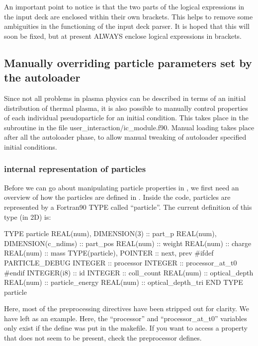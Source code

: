 An important point to notice is that the two parts of the logical expressions
in the input deck are enclosed within their own brackets. This helps to remove
some ambiguities in the functioning of the input deck parser. It is hoped that
this will soon be fixed, but at present ALWAYS enclose logical expressions in
brackets.


\subsection{Manually overriding particle parameters set by the autoloader}
\label{sec:manualload}

Since not all problems in plasma physics can be described in terms of an
initial distribution of thermal plasma, it is also possible to manually
control properties of each individual pseudoparticle for an initial
condition. This takes place in the subroutine  in the
file user\_interaction/ic\_module.f90. Manual loading takes place after
all the autoloader phase, to allow manual tweaking of autoloader specified
initial conditions.

\subsubsection{\texorpdfstring
  {{\EPOCH} internal representation of particles}
  {{EPOCH} internal representation of particles}}
\label{sec:partrep}
Before we can go about manipulating particle properties in
, we first need an overview of how the particles
are defined in {\EPOCH}.
Inside the code, particles are represented by a Fortran90 TYPE called
``particle''. The current definition of this type (in 2D) is:
\begin{boxverbatim}
  TYPE particle
    REAL(num), DIMENSION(3) :: part_p
    REAL(num), DIMENSION(c_ndims) :: part_pos
    REAL(num) :: weight
    REAL(num) :: charge
    REAL(num) :: mass
    TYPE(particle), POINTER :: next, prev
#ifdef PARTICLE_DEBUG
    INTEGER :: processor
    INTEGER :: processor_at_t0
#endif
    INTEGER(i8) :: id
    INTEGER :: coll_count
    REAL(num) :: optical_depth
    REAL(num) :: particle_energy
    REAL(num) :: optical_depth_tri
  END TYPE particle
\end{boxverbatim}
Here, most of the preprocessing directives have been stripped out for clarity.
We have left  as an example.
Here, the ``processor'' and ``processor\_at\_t0'' variables only exist if the
 define was put in
the makefile. If you want to access a property that does not seem to be
present, check the preprocessor defines.

